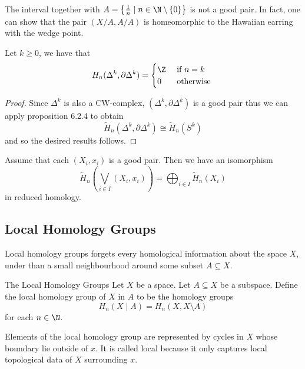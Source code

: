 \documentclass[a4paper]{article}
\begin{document}
The interval together with $A=\left\{\frac{1}{n}\;|\;n\in\N\setminus\{0\}\right\}$ is not a good pair. In fact, one can show that the pair $(X/A,A/A)$ is homeomorphic to the Hawaiian earring with the wedge point. 

\begin{prp}{}{} Let $k\geq 0$, we have that $$H_n(\Delta^k,\partial\Delta^k)=\begin{cases}
\Z & \text{ if } n=k\\
0 & \text{ otherwise }
\end{cases}$$ 
\begin{proof}
Since $\Delta^k$ is also a CW-complex, $(\Delta^k,\partial\Delta^k)$ is a good pair thus we can apply proposition 6.2.4 to obtain $$\widetilde{H}_n(\Delta^k,\partial\Delta^k)\cong\tilde{H}_n(S^k)$$ and so the desired results follows. 
\end{proof}
\end{prp}

\begin{lmm}{}{} Assume that each $(X_i,x_i)$ is a good pair. Then we have an isomorphism $$\widetilde{H}_n\left(\bigvee_{i\in I}(X_i,x_i)\right)=\bigoplus_{i\in I}\widetilde{H}_n(X_i)$$ in reduced homology. 
\end{lmm}

\subsection{Local Homology Groups}
Local homology groups forgets every homological information about the space $X$, under than a small neighbourhood around some subset $A\subseteq X$. 

\begin{defn}{The Local Homology Groups}{} Let $X$ be a space. Let $A\subseteq X$ be a subspace. Define the local homology group of $X$ in $A$ to be the homology groups $$H_n(X\;|\;A)=H_n(X,X\setminus A)$$ for each $n\in\N$. 
\end{defn}

Elements of the local homology group are represented by cycles in $X$ whose boundary lie outside of $x$. It is called local because it only captures local topological data of $X$ surrounding $x$. 
\end{document}
